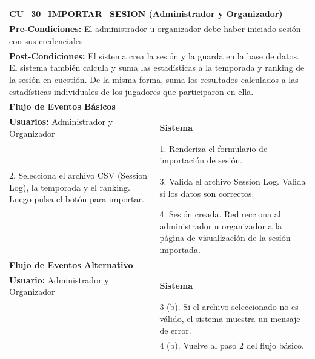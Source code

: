 \begin{center}
  \begin{tabular}{| p{7.5cm} | p{7.5cm} |}
    \hline
    \multicolumn{2}{|p{15cm}|}{\textbf{CU\_30\_IMPORTAR\_SESION} (Administrador y Organizador)} \\ \hline
    \multicolumn{2}{|p{15cm}|}{\textbf{Pre-Condiciones:} El administrador u organizador debe haber iniciado sesión con sus credenciales.} \\ \hline
    \multicolumn{2}{|p{15cm}|}{\textbf{Post-Condiciones:} El sistema crea la sesión y la guarda en la base de datos. El sistema también calcula y suma las estadísticas a la temporada y ranking de la sesión en cuestión. De la misma forma, suma los resultados calculados a las estadísticas individuales de los jugadores que participaron en ella.} \\ \hline
    \multicolumn{2}{|p{7.5cm}|}{\textbf{Flujo de Eventos Básicos}} \\ \hline
    \multicolumn{1}{|p{7.5cm}|}{\textbf{Usuarios:} Administrador y Organizador} & \multicolumn{1}{|p{7.5cm}|}{\textbf{Sistema}} \\ \hline
    
    \multicolumn{1}{|p{7.5cm}|}{} & 
    \multicolumn{1}{|p{7.5cm}|}{1. Renderiza el formulario de importación de sesión.}\\ \hline
    
    \multicolumn{1}{|p{7.5cm}|}{2. Selecciona el archivo CSV (Session Log), la temporada y el ranking. Luego pulsa el botón para importar.}& 
    \multicolumn{1}{|p{7.5cm}|}{3. Valida el archivo Session Log. Valida si los datos son correctos.}\\ \hline
    
    \multicolumn{1}{|p{7.5cm}|}{} & 
    \multicolumn{1}{|p{7.5cm}|}{4. Sesión creada. Redirecciona al administrador u organizador a la página de visualización de la sesión importada.}\\ \hline
    
    \multicolumn{2}{|p{7.5cm}|}{\textbf{Flujo de Eventos Alternativo}} \\ \hline
    
    \multicolumn{1}{|p{7.5cm}|}{\textbf{Usuario:} Administrador y Organizador} & \multicolumn{1}{|p{7.5cm}|}{\textbf{Sistema}} \\ \hline
    
    \multicolumn{1}{|p{7.5cm}|}{} & 
    \multicolumn{1}{|p{7.5cm}|}{3 (b). Si el archivo seleccionado no es válido, el sistema muestra un mensaje de error.}\\ \hline
    
    \multicolumn{1}{|p{7.5cm}|}{} & 
    \multicolumn{1}{|p{7.5cm}|}{4 (b). Vuelve al paso 2 del flujo básico.}\\ \hline
  \end{tabular}
  
  \label{table:usecase:30}
\end{center}

